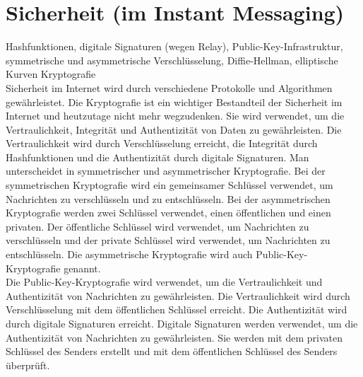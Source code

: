 \section{Sicherheit (im Instant Messaging)}
\label{sec:sicherheit_im}

Hashfunktionen, digitale Signaturen (wegen Relay), Public-Key-Infrastruktur, symmetrische und asymmetrische Verschlüsselung, Diffie-Hellman, elliptische Kurven Kryptografie \\

\noindent Sicherheit im Internet wird durch verschiedene Protokolle und Algorithmen gewährleistet. Die Kryptografie ist ein wichtiger Bestandteil der Sicherheit im Internet und heutzutage nicht mehr wegzudenken. Sie wird verwendet, um die Vertraulichkeit, Integrität und Authentizität von Daten zu gewährleisten. Die Vertraulichkeit wird durch Verschlüsselung erreicht, die Integrität durch Hashfunktionen und die Authentizität durch digitale Signaturen. Man unterscheidet in symmetrischer und asymmetrischer Kryptografie. Bei der symmetrischen Kryptografie wird ein gemeinsamer Schlüssel verwendet, um Nachrichten zu verschlüsseln und zu entschlüsseln. Bei der asymmetrischen Kryptografie werden zwei Schlüssel verwendet, einen öffentlichen und einen privaten. Der öffentliche Schlüssel wird verwendet, um Nachrichten zu verschlüsseln und der private Schlüssel wird verwendet, um Nachrichten zu entschlüsseln. Die asymmetrische Kryptografie wird auch Public-Key-Kryptografie genannt. \\

\noindent Die Public-Key-Kryptografie wird verwendet, um die Vertraulichkeit und Authentizität von Nachrichten zu gewährleisten. Die Vertraulichkeit wird durch Verschlüsselung mit dem öffentlichen Schlüssel erreicht. Die Authentizität wird durch digitale Signaturen erreicht. Digitale Signaturen werden verwendet, um die Authentizität von Nachrichten zu gewährleisten. Sie werden mit dem privaten Schlüssel des Senders erstellt und mit dem öffentlichen Schlüssel des Senders überprüft. \\
